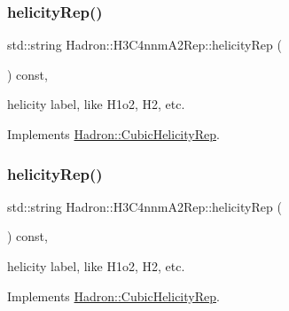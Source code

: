 \mbox{\label{structHadron_1_1H3C4nnmA2Rep_acabc462818e030ca95a03f9ecf996e35}} 
\subsubsection{\texorpdfstring{helicityRep()}{helicityRep()}\hspace{0.1cm}{\footnotesize\ttfamily [1/2]}}
{\footnotesize\ttfamily std\+::string Hadron\+::\+H3\+C4nnm\+A2\+Rep\+::helicity\+Rep (\begin{DoxyParamCaption}{ }\end{DoxyParamCaption}) const\hspace{0.3cm}{\ttfamily [inline]}, {\ttfamily [virtual]}}

helicity label, like H1o2, H2, etc. 

Implements \mbox{\hyperlink{structHadron_1_1CubicHelicityRep_af1096946b7470edf0a55451cc662f231}{Hadron\+::\+Cubic\+Helicity\+Rep}}.

\mbox{\label{structHadron_1_1H3C4nnmA2Rep_acabc462818e030ca95a03f9ecf996e35}} 
\subsubsection{\texorpdfstring{helicityRep()}{helicityRep()}\hspace{0.1cm}{\footnotesize\ttfamily [2/2]}}
{\footnotesize\ttfamily std\+::string Hadron\+::\+H3\+C4nnm\+A2\+Rep\+::helicity\+Rep (\begin{DoxyParamCaption}{ }\end{DoxyParamCaption}) const\hspace{0.3cm}{\ttfamily [inline]}, {\ttfamily [virtual]}}

helicity label, like H1o2, H2, etc. 

Implements \mbox{\hyperlink{structHadron_1_1CubicHelicityRep_af1096946b7470edf0a55451cc662f231}{Hadron\+::\+Cubic\+Helicity\+Rep}}.

\mbox{\label{structHadron_1_1H3C4nnmA2Rep_a2e3cc9bd16d8097b2b57f500b0d82be1}} 

